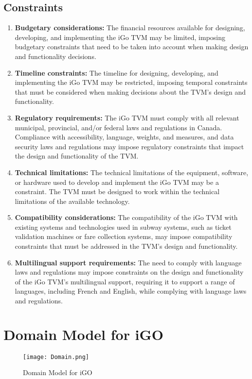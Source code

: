 \documentclass[a4paper,12pt]{report}
\begin{document}
\section{Constraints}
\begin{enumerate}
\item \textbf{Budgetary considerations:} The financial resources available for designing, developing, and implementing the iGo TVM may be limited, imposing budgetary constraints that need to be taken into account when making design and functionality decisions.

\item \textbf{Timeline constraints:} The timeline for designing, developing, and implementing the iGo TVM may be restricted, imposing temporal constraints that must be considered when making decisions about the TVM's design and functionality.

\item \textbf{Regulatory requirements:} The iGo TVM must comply with all relevant municipal, provincial, and/or federal laws and regulations in Canada. Compliance with accessibility, language, weights, and measures, and data security laws and regulations may impose regulatory constraints that impact the design and functionality of the TVM.

\item \textbf{Technical limitations:} The technical limitations of the equipment, software, or hardware used to develop and implement the iGo TVM may be a constraint. The TVM must be designed to work within the technical limitations of the available technology.

\item \textbf{Compatibility considerations:} The compatibility of the iGo TVM with existing systems and technologies used in subway systems, such as ticket validation machines or fare collection systems, may impose compatibility constraints that must be addressed in the TVM's design and functionality.

\item \textbf{Multilingual support requirements:} The need to comply with language laws and regulations may impose constraints on the design and functionality of the iGo TVM's multilingual support, requiring it to support a range of languages, including French and English, while complying with language laws and regulations.

\end{enumerate}


\chapter {Domain Model for iGO}
\begin{figure}[h!]
  \centering
   \texttt{[image: Domain.png]}
  \caption{Domain Model for iGO}
\end{figure}
\end{document}
